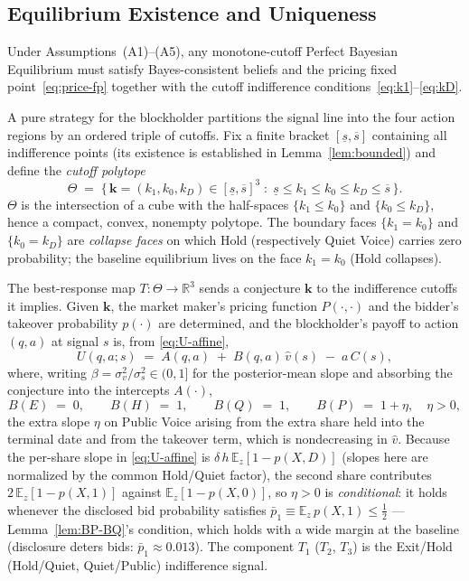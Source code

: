 \documentclass[11pt]{article}
\newcommand{\E}{\mathbb{E}}
\newcommand{\1}{\mathbf{1}}
\newcommand{\R}{\mathbb{R}}
\providecommand{\kvec}{\mathbf{k}}
\providecommand{\kone}{k_1}
\providecommand{\kzero}{k_0}
\providecommand{\kD}{k_D}
\providecommand{\Tmap}{T}
\providecommand{\vhat}{\hat{v}}
\providecommand{\sv}{\sigma_v}
\providecommand{\deltaliq}{\delta}
\providecommand{\Ccost}{C}
\begin{document}
%
\subsection{Equilibrium Existence and Uniqueness}
%

Under Assumptions~\textup{(A1)}--\textup{(A5)}, any monotone-cutoff Perfect Bayesian Equilibrium must satisfy Bayes-consistent beliefs and the pricing fixed point~\eqref{eq:price-fp} together with the cutoff indifference conditions~\eqref{eq:k1}--\eqref{eq:kD}.

A pure strategy for the blockholder partitions the signal line into the four action regions by an ordered triple of cutoffs. Fix a finite bracket $[\underline{s},\overline{s}]$ containing all indifference points (its existence is established in Lemma~\ref{lem:bounded}) and define the \emph{cutoff polytope}
\begin{equation}
\label{eq:theta}
\Theta \;=\; \bigl\{\, \kvec=(\kone,\kzero,\kD)\in[\underline{s},\overline{s}]^3
\;:\; \underline{s}\le \kone \le \kzero \le \kD \le \overline{s}\,\bigr\}.
\end{equation}
$\Theta$ is the intersection of a cube with the half-spaces $\{\kone\le\kzero\}$ and $\{\kzero\le\kD\}$, hence a compact, convex, nonempty polytope. The boundary faces $\{\kone=\kzero\}$ and $\{\kzero=\kD\}$ are \emph{collapse faces} on which Hold (respectively Quiet Voice) carries zero probability; the baseline equilibrium lives on the face $\kone=\kzero$ (Hold collapses).

The best-response map $\Tmap:\Theta\to\R^3$ sends a conjecture $\kvec$ to the indifference cutoffs it implies. Given $\kvec$, the market maker's pricing function $P(\cdot,\cdot)$ and the bidder's takeover probability $p(\cdot)$ are determined, and the blockholder's payoff to action $(q,a)$ at signal $s$ is, from \eqref{eq:U-affine},
\begin{equation}
\label{eq:payoff-affine}
U(q,a;s) \;=\; A(q,a)\;+\; B(q,a)\,\vhat(s)\;-\;a\,\Ccost(s),
\end{equation}
where, writing $\beta=\sv^2/\sigma_s^2\in(0,1]$ for the posterior-mean slope and absorbing the conjecture into the intercepts $A(\cdot)$,
\begin{equation}
\label{eq:slopes}
B(E)\;=\;0,\qquad B(H)\;=\;1,\qquad B(Q)\;=\;1,\qquad B(P)\;=\;1+\eta,
\quad \eta>0,
\end{equation}
the extra slope $\eta$ on Public Voice arising from the extra share held into the terminal date and from the takeover term, which is nondecreasing in $\vhat$. Because the per-share slope in \eqref{eq:U-affine} is $\deltaliq\,h\,\E_z[1-p(X,D)]$ (slopes here are normalized by the common Hold/Quiet factor), the second share contributes $2\,\E_z[1-p(X,1)]$ against $\E_z[1-p(X,0)]$, so $\eta>0$ is \emph{conditional}: it holds whenever the disclosed bid probability satisfies $\bar p_1\equiv\E_z\,p(X,1)\le\tfrac12$ --- Lemma~\ref{lem:BP-BQ}'s condition, which holds with a wide margin at the baseline (disclosure deters bids: $\bar p_1\approx0.013$). The component $\Tmap_1$ ($\Tmap_2$, $\Tmap_3$) is the Exit/Hold (Hold/Quiet, Quiet/Public) indifference signal.
\end{document}
